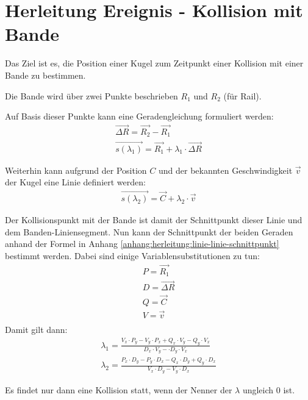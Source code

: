 \section{Herleitung Ereignis - Kollision mit Bande}\label{anhang:herleitung:event:collisionWithRail}
Das Ziel ist es, die Position einer Kugel zum Zeitpunkt einer Kollision mit einer Bande zu bestimmen.

Die Bande wird über zwei Punkte beschrieben $R_1$ und $R_2$ (für Rail).

Auf Basis dieser Punkte kann eine Geradengleichung formuliert werden:
\begin{align}
    \vec{\Delta R} = \vec{R_2} - \vec{R_1}\\
    \vec{s(\lambda_1)} = \vec{R_1} + \lambda_1 \cdot \vec{\Delta R}
\end{align}

Weiterhin kann aufgrund der Position $C$ und der bekannten Geschwindigkeit $\vec{v}$ der Kugel eine Linie definiert werden:
\begin{align}
    \vec{s(\lambda_2)} = \vec{C} + \lambda_2 \cdot \vec{v}\label{eq:event_rail_collision:line_equation_ball}
\end{align}

Der Kollisionspunkt mit der Bande ist damit der Schnittpunkt dieser Linie und dem Banden-Liniensegment.
Nun kann der Schnittpunkt der beiden Geraden anhand der Formel in Anhang \ref{anhang:herleitung:linie-linie-schnittpunkt} bestimmt werden.
Dabei sind einige Variablensubstitutionen zu tun:
\begin{align}
    P = \vec{R_1}\\
    D = \vec{\Delta R}\\
    Q = \vec{C}\\
    V = \vec{v}\\
\end{align}
Damit gilt dann:
\begin{align}
    \lambda_1 = \frac{V_x \cdot P_y - V_y \cdot P_x + Q_x \cdot V_y - Q_y \cdot V_x}{D_x \cdot V_y - \cdot D_y \cdot V_x}\\
    \lambda_2 = \frac{P_x \cdot D_y - P_y \cdot D_x - Q_x \cdot D_y + Q_y \cdot D_x}{V_x \cdot D_y - V_y \cdot D_x}
\end{align}
\iffalse %
Nach der Variablensubstitution gilt:
\begin{align}
    \lambda_1 = \frac{\vec{v}_x \cdot \vec{R_1}_y - \vec{v}_y \cdot \vec{R_1}_x + \vec{C}_x \cdot \vec{v}_y - \vec{C}_y \cdot \vec{v}_x}{\vec{\Delta R}_x \cdot \vec{v}_y - \cdot \vec{\Delta R}_y \cdot \vec{v}_x}\\
    \lambda_2 = \frac{\vec{R_1}_x \cdot \vec{\Delta R}_y - \vec{R_1}_y \cdot \vec{\Delta R}_x - \vec{C}_x \cdot \vec{\Delta R}_y + \vec{C}_y \cdot \vec{\Delta R}D_x}{\vec{v}_x \cdot \vec{\Delta R_y - \vec{v}_y \cdot \vec{\Delta R}_x}
\end{align}
\fi
Es findet nur dann eine Kollision statt, wenn der Nenner der $\lambda$ ungleich $0$ ist.


